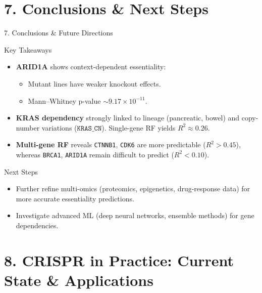 \documentclass[10pt]{beamer}
\begin{document}
\section{7. Conclusions \& Next Steps}

\begin{frame}{7. Conclusions \& Future Directions}
  \begin{block}{Key Takeaways}
    \begin{itemize}
      \item \textbf{ARID1A} shows context-dependent essentiality:
        \begin{itemize}
          \item Mutant lines have weaker knockout effects.
          \item Mann--Whitney p-value $\sim 9.17\times 10^{-11}$.
        \end{itemize}
      \item \textbf{KRAS dependency} strongly linked to lineage (pancreatic, bowel)
            and copy-number variations (\(\texttt{KRAS\_CN}\)).
            Single-gene RF yields \(R^2 \approx 0.26\).
      \item \textbf{Multi-gene RF} reveals \texttt{CTNNB1}, \texttt{CDK6} are more predictable
            (\(R^2>0.45\)), whereas \texttt{BRCA1}, \texttt{ARID1A} remain difficult to predict (\(R^2<0.10\)).
    \end{itemize}
  \end{block}

  \begin{block}{Next Steps}
    \begin{itemize}
      \item Further refine multi-omics (proteomics, epigenetics, drug-response data) for more accurate essentiality predictions.
      \item Investigate advanced ML (deep neural networks, ensemble methods) for gene dependencies.
    \end{itemize}
  \end{block}
\end{frame}

\section{8. CRISPR in Practice: Current State \& Applications}
\end{document}
